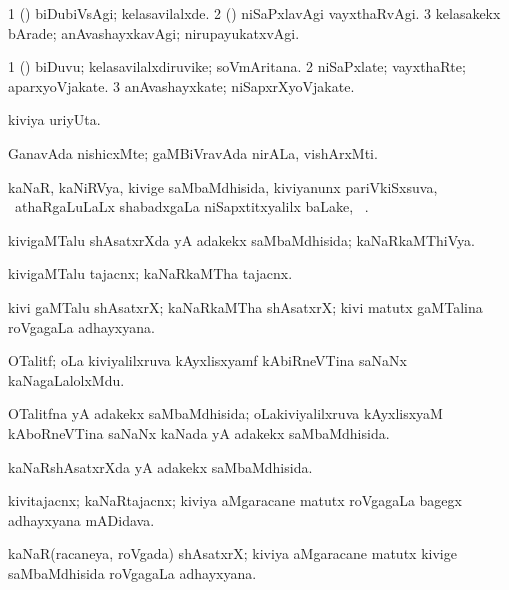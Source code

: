 \bentry
{}
\gl{\kirxvi}
\bmng
\bnum
\num{1} (\pArxparx) biDubiVsAgi; kelasavilalxde. 
\num{2} (\viparx) niSaPxlavAgi vayxthaRvAgi. 
\num{3} kelasakekx bArade; anAvashayxkavAgi; nirupayukatxvAgi. 
\enum
\emng
\eentry

\bentry
{}
\gl{\nA}
\bmng
\bnum
\num{1} (\pArxparx) biDuvu; kelasavilalxdiruvike; soVmAritana. 
\num{2} niSaPxlate; vayxthaRte; aparxyoVjakate. 
\num{3} anAvashayxkate; niSapxrXyoVjakate. 
\enum
\emng
\eentry

\bentry
{}
\gl{\nA}
\bmng
kiviya uriyUta. 
\emng
\eentry

\bentry
{}
\gl{\nA}
\expl{\Latin}
\bmng
GanavAda nishicxMte; gaMBiVravAda nirALa, vishArxMti. 
\emng
\eentry

\bentry
{}
\gl{\pUparx}
\bmng
kaNaR, kaNiRVya, kivige saMbaMdhisida, kiviyanunx pariVkiSxsuva, \mo\ athaRgaLuLaLx shabadxgaLa niSapxtitxyalilx baLake, \udA\ . 
\emng
\eentry

\bentry
{}
\gl{\gu}
\bmng
kivigaMTalu shAsatxrXda yA adakekx saMbaMdhisida; kaNaRkaMThiVya. 
\emng
\eentry

\bentry
{}
\gl{\nA}
\bmng
kivigaMTalu tajacnx; kaNaRkaMTha tajacnx. 
\emng
\eentry

\bentry
{}
\gl{\nA}
\bmng
kivi gaMTalu shAsatxrX; kaNaRkaMTha shAsatxrX; kivi matutx gaMTalina roVgagaLa adhayxyana. 
\emng
\eentry

\bentry
{}
\gl{\nA}
\bmng
OTalitf; oLa kiviyalilxruva kAyxlisxyamf kAbiRneVTina saNaNx kaNagaLalolxMdu. 
\emng
\eentry

\bentry
{}
\gl{\gu}
\bmng
OTalitfna yA adakekx saMbaMdhisida; oLakiviyalilxruva kAyxlisxyaM kAboRneVTina saNaNx kaNada yA adakekx saMbaMdhisida. 
\emng
\eentry

\bentry
{}
\gl{\gu}
\bmng
kaNaRshAsatxrXda yA adakekx saMbaMdhisida. 
\emng
\eentry

\bentry
{}
\gl{\nA}
\bmng
kivitajacnx; kaNaRtajacnx; kiviya aMgaracane matutx roVgagaLa bagegx adhayxyana mADidava. 
\emng
\eentry

\bentry
{}
\gl{\nA}
\bmng
kaNaR(racaneya, roVgada) shAsatxrX; kiviya aMgaracane matutx kivige saMbaMdhisida roVgagaLa adhayxyana. 
\emng
\eentry

